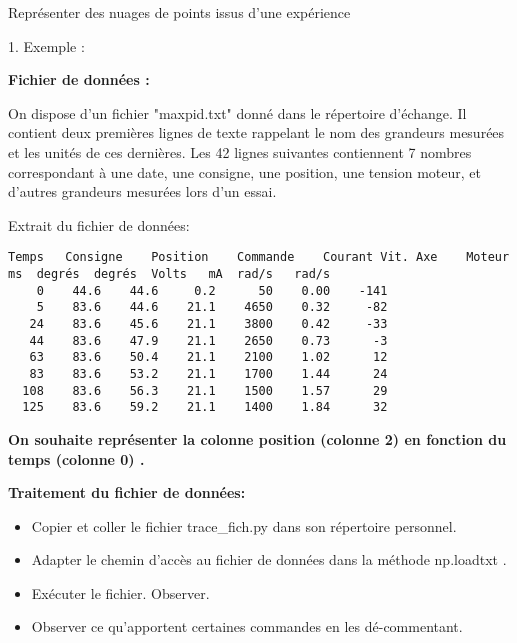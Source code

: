 \documentclass[12pt,a4paper]{article}
\begin{document}
{\Large Représenter des nuages de points issus d'une expérience}

\bigskip

{\Large 1. Exemple :}

\medskip

\textbf{Fichier de données :}

On dispose d'un fichier "maxpid.txt" donné dans le répertoire d'échange. Il contient deux premières lignes de texte rappelant le nom des grandeurs mesurées et les unités de ces dernières. Les 42 lignes suivantes contiennent 7 nombres correspondant à une date, une consigne, une position, une tension moteur, et d'autres grandeurs mesurées lors d'un essai. 

\medskip
Extrait du fichier de données:

\medskip

\hspace{2cm}\begin{minipage}{0.7\linewidth}
\begin{verbatim}
Temps	Consigne	Position	Commande	Courant	Vit. Axe	Moteur
ms	degrés	degrés	Volts	mA	rad/s	rad/s
    0 	 44.6 	 44.6 	  0.2 	   50 	 0.00 	 -141
    5 	 83.6 	 44.6 	 21.1 	 4650    0.32	  -82
   24 	 83.6 	 45.6 	 21.1 	 3800 	 0.42 	  -33
   44 	 83.6 	 47.9 	 21.1 	 2650 	 0.73 	   -3
   63 	 83.6 	 50.4 	 21.1 	 2100 	 1.02 	   12
   83 	 83.6 	 53.2 	 21.1 	 1700 	 1.44 	   24
  108 	 83.6 	 56.3 	 21.1 	 1500 	 1.57 	   29
  125 	 83.6 	 59.2 	 21.1 	 1400 	 1.84 	   32
\end{verbatim}
\end{minipage}




\medskip

\textbf{On souhaite représenter la colonne position (colonne 2)  en fonction du temps (colonne 0) .
}



\bigskip

\textbf{Traitement du fichier de données:
}
\begin{itemize}
\item Copier et coller le fichier trace\_fich.py dans son répertoire personnel. 
\item Adapter le chemin d'accès au fichier de données dans la méthode np.loadtxt .
\item Exécuter le fichier. Observer. 
\item Observer ce qu'apportent certaines commandes en les dé-commentant.
\end{itemize}
\end{document}

